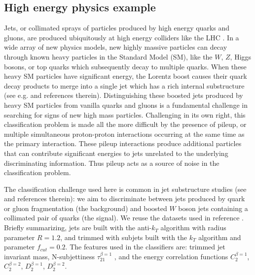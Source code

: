 \documentclass[twocolumn,superscriptaddress,aps]{revtex4-1}
\theoremstyle{plain}
\begin{document}
\subsection{High energy physics example}
\label{sec:hep}

Jets, or collimated sprays of particles produced by high energy quarks and
gluons, are produced ubiquitously at high energy colliders like the LHC \citep{LHCMachine}.
In a wide array of new physics models, new highly
massive particles can decay through known heavy particles in the Standard Model (SM),
like the $W$, $Z$, Higgs bosons, or top quarks which subsequently decay to
multiple quarks.  When these heavy SM particles have significant energy,
the Lorentz boost causes their quark decay products to merge into a single jet
which has a rich internal substructure (see e.g.
\citep{Altheimer:2012mn,Altheimer:2013yza} and references therein).
Distinguishing these boosted jets produced by heavy SM particles from
vanilla quarks and  gluons is a fundamental challenge in searching for signs of
new high mass particles. Challenging in its own right, this classification
problem is made all the more difficult by the presence of pileup, or multiple
simultaneous proton-proton interactions occurring at the same time as the primary
interaction.  These pileup interactions produce additional particles that can
contribute significant energies to jets unrelated to the underlying
discriminating information. Thus pileup acts as a source of noise in the
classification problem.

The classification challenge used here is common in jet substructure
studies (see \citep{Khachatryan:2014vla,ATL-PHYS-PUB-2015-033,wbosonATLAS} and
references therein): we aim to discriminate between jets produced by quark or gluon fragmentation (the
background) and  boosted $W$ boson jets containing a collimated pair of
quarks (the signal).  We reuse the datasets used in reference
\citep{baldi2016jet}.  Briefly summarizing, jets are built with the
anti-$k_T$ algorithm \citep{Cacciari:2008gp}
with radius parameter $R=1.2$, and trimmed \citep{Krohn:2009th} with subjets built with
the $k_T$ algorithm and parameter $f_{cut}=0.2$. The features used
in the classifiers are: trimmed jet invariant mass, N-subjettiness
$\tau_{21}^{\beta=1}$ \citep{nsub,Thaler2012}, and the energy correlation
functions \citep{Larkoski2013} $C_{2}^{\beta=1}$, $C_{2}^{\beta=2}$,
$D_{2}^{\beta=1}$, $D_{2}^{\beta=2}$.
\end{document}
